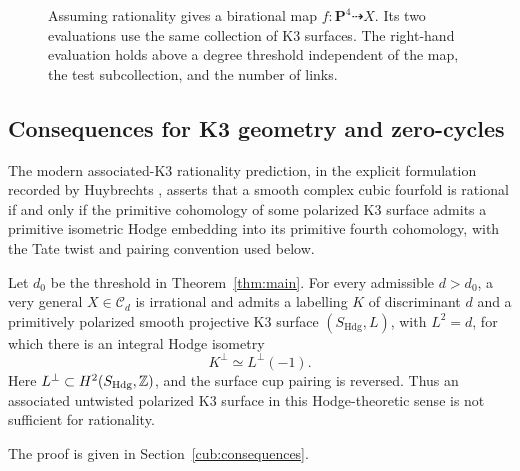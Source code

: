 \begin{figure}[ht]
\centering
{}
\caption{Assuming rationality gives a birational map
\(f:\mathbf P^4\dashrightarrow X\). Its two evaluations use the same
collection of K3 surfaces.
The right-hand evaluation holds above a degree threshold independent
of the map, the test subcollection, and the number of links.}
\label{fig:two-evaluations}
\end{figure}
\FloatBarrier

\subsection{Consequences for K3 geometry and zero-cycles}

The modern associated-K3 rationality prediction, in the explicit
formulation recorded by Huybrechts
\cite[Conjecture~2.1, equation~(2.1)]{HuybrechtsUpdate25}, asserts that a
smooth complex cubic fourfold is rational if and only if the primitive
cohomology of some polarized K3 surface admits a primitive isometric Hodge
embedding into its primitive fourth cohomology, with the Tate twist and
pairing convention used below.

\begin{corollary}\label{cor:associated-k3}
Let \(d_0\) be the threshold in Theorem~\ref{thm:main}. For every admissible
\(d>d_0\), a very general \(X\in\mathcal C_d\) is irrational and admits a
labelling \(K\) of discriminant \(d\) and a primitively polarized smooth
projective K3 surface \((S_{\mathrm{Hdg}},L)\), with \(L^2=d\), for which
there is an integral Hodge isometry
\[
 K^\perp \simeq L^\perp(-1).
\]
Here \(L^\perp\subset H^2(S_{\mathrm{Hdg}},\mathbb Z)\), and the surface cup
pairing is reversed. Thus an associated untwisted polarized K3 surface in
this Hodge-theoretic sense is not sufficient for rationality.
\end{corollary}

The proof is given in Section~\ref{cub:consequences}.

